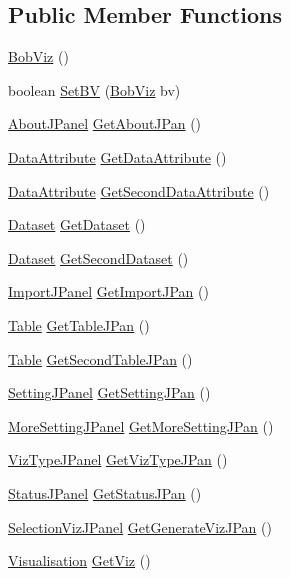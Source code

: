 \subsection*{Public Member Functions}
\begin{DoxyCompactItemize}
\item 
\hyperlink{class_bob_viz_a362406b3528e341eb5f8339e28ae7a17}{Bob\-Viz} ()
\item 
boolean \hyperlink{class_bob_viz_a76ae5d60149c159834708456b28d9222}{Set\-B\-V} (\hyperlink{class_bob_viz}{Bob\-Viz} bv)
\item 
\hyperlink{class_about_j_panel}{About\-J\-Panel} \hyperlink{class_bob_viz_aac948a35c1e508b168aad19efba2053d}{Get\-About\-J\-Pan} ()
\item 
\hyperlink{class_data_attribute}{Data\-Attribute} \hyperlink{class_bob_viz_acc980a6db181f9ace3279e5dd3fd23b8}{Get\-Data\-Attribute} ()
\item 
\hyperlink{class_data_attribute}{Data\-Attribute} \hyperlink{class_bob_viz_a3bbdcd2d94adf10bfd50ae6eefe90717}{Get\-Second\-Data\-Attribute} ()
\item 
\hyperlink{class_dataset}{Dataset} \hyperlink{class_bob_viz_ab8866566b53e78c66e29a4d68406b860}{Get\-Dataset} ()
\item 
\hyperlink{class_dataset}{Dataset} \hyperlink{class_bob_viz_a2826dca37585b5effe3a2f2222f17ada}{Get\-Second\-Dataset} ()
\item 
\hyperlink{class_import_j_panel}{Import\-J\-Panel} \hyperlink{class_bob_viz_a93eb7320a1f76d531874cd0bfe5c6b71}{Get\-Import\-J\-Pan} ()
\item 
\hyperlink{class_table}{Table} \hyperlink{class_bob_viz_a52e7c8f67daa12f4882a396e557e8ed4}{Get\-Table\-J\-Pan} ()
\item 
\hyperlink{class_table}{Table} \hyperlink{class_bob_viz_afce2ebaa330fc80c477b7156fc5bc32e}{Get\-Second\-Table\-J\-Pan} ()
\item 
\hyperlink{class_setting_j_panel}{Setting\-J\-Panel} \hyperlink{class_bob_viz_a10dab616869fe644d16c2ccf78627af5}{Get\-Setting\-J\-Pan} ()
\item 
\hyperlink{class_more_setting_j_panel}{More\-Setting\-J\-Panel} \hyperlink{class_bob_viz_a26ad68d96e3524c2eb53425f59deab8a}{Get\-More\-Setting\-J\-Pan} ()
\item 
\hyperlink{class_viz_type_j_panel}{Viz\-Type\-J\-Panel} \hyperlink{class_bob_viz_a35af0807f9fca7a0773ce8217b2065c7}{Get\-Viz\-Type\-J\-Pan} ()
\item 
\hyperlink{class_status_j_panel}{Status\-J\-Panel} \hyperlink{class_bob_viz_a31b771c2acf2b72658beb4f3eecab892}{Get\-Status\-J\-Pan} ()
\item 
\hyperlink{class_selection_viz_j_panel}{Selection\-Viz\-J\-Panel} \hyperlink{class_bob_viz_a4b1e563e0fa60594fa0beb1d50438824}{Get\-Generate\-Viz\-J\-Pan} ()
\item 
\hyperlink{class_visualisation}{Visualisation} \hyperlink{class_bob_viz_a239767cb7f7f32710826f9efc91b4af9}{Get\-Viz} ()
\end{DoxyCompactItemize}


